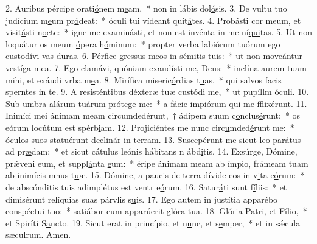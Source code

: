 2. Auribus pércipe orati\uline{ó}nem m\uline{e}am,~* non in lábis dol\uline{ó}sis.
3. De vultu tuo judícium m\uline{e}um pr\uline{ó}deat:~* óculi tui vídeant quit\uline{á}tes.
4. Probásti cor meum, et visit\uline{á}sti n\uline{o}cte:~* igne me examinásti, et non est invénta in me ní\uline{qui}tas.
5. Ut non loquátur os meum \uline{ó}pera h\uline{ó}minum:~* propter verba labiórum tuórum ego custodívi vas d\uline{u}ras.
6. Pérfice gressus meos in s\uline{é}mitis t\uline{u}is:~* ut non moveántur vestíga m\uline{e}a.
7. Ego clamávi, quóniam exaud\uline{í}sti me, D\uline{e}us:~* inclína aurem tuam mihi, et exáudi vrba m\uline{e}a.
8. Mirífica miseric\uline{ó}rdias t\uline{u}as,~* qui salvos facis sperntes \uline{i}n te.
9. A resisténtibus déxteræ t\uline{u}æ cust\uline{ó}di me,~* ut pupíllm óc\uline{u}li.
10. Sub umbra alárum tuárum pr\uline{ó}teg\uline{e} me:~* a fácie impiórum qui me fflix\uline{é}runt.
11. Inimíci mei ánimam meam circumdedérunt,~† ádipem suum c\uline{o}nclus\uline{é}runt:~* os eórum locútum est spérb\uline{i}am.
12. Projiciéntes me nunc circ\uline{u}mded\uline{é}runt me:~* óculos suos statuérunt declinár in t\uline{e}rram.
13. Suscepérunt me sicut leo par\uline{á}tus ad pr\uline{æ}dam:~* et sicut cátulus leónis hábitans n ábd\uline{i}tis.
14. Exsúrge, Dómine, prǽveni eum, et suppl\uline{á}nta \uline{e}um:~* éripe ánimam meam ab ímpio, frámeam tuam ab inimícis mnus t\uline{u}æ.
15. Dómine, a paucis de terra dívide eos in v\uline{i}ta e\uline{ó}rum:~* de abscónditis tuis adimplétus est ventr e\uline{ó}rum.
16. Satur\uline{á}ti sunt f\uline{í}liis:~* et dimisérunt relíquias suas párvlis s\uline{u}is.
17. Ego autem in justítia apparébo consp\uline{é}ctui t\uline{u}o:~* satiábor cum apparúerit glóra t\uline{u}a.
18. Glória P\uline{a}tri, et F\uline{í}lio,~* et Spiríti S\uline{a}ncto.
19. Sicut erat in princípio, et n\uline{u}nc, et s\uline{e}mper,~* et in sǽcula sæculrum. \uline{A}men.
